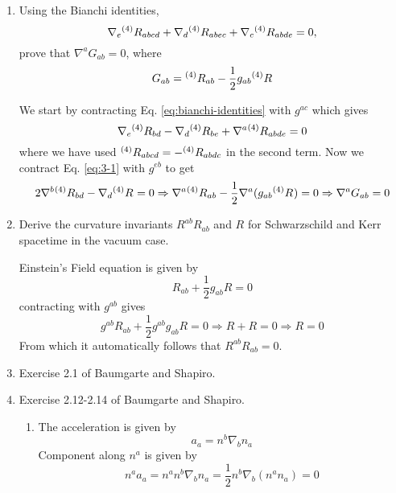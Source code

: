 \documentclass[10pt]{article}
\begin{document}
\begin{enumerate}
\item Using the Bianchi identities,
  \begin{equation}
    \label{eq:bianchi-identities}
    \nabla_e{}^{(4)}R_{abcd} + \nabla_d{}^{(4)}R_{abec} + \nabla_c{}^{(4)}R_{abde} = 0,
  \end{equation}
  prove that $\nabla^aG_{ab} = 0$, where
  \begin{equation}
    \label{eq:Gab}
    G_{ab} = {}^{(4)}R_{ab} - \frac{1}{2}g_{ab} {}^{(4)}R_{}
  \end{equation}

  We start by contracting Eq. \eqref{eq:bianchi-identities} with $g^{ac}$ which gives
  \begin{equation}
    \label{eq:3-1}
    \nabla_{e}{}^{(4)}R_{bd} - \nabla_d {}^{(4)}R_{be} + \nabla^a{}^{(4)}R_{abde} = 0
  \end{equation}
  where we have used ${}^{(4)}R_{abcd} = - {}^{(4)}R_{abdc}$ in the second term. Now we contract Eq. \eqref{eq:3-1} with $g^{eb}$ to get
  \begin{equation}
    \label{eq:}
    2 \nabla^b {}^{(4)}R_{bd} - \nabla_d {}^{(4)}R_{} = 0 \Rightarrow \nabla^a{}^{(4)}R_{ab} - \frac{1}{2} \nabla^a (g_{ab}{}^{(4)}R_{}) = 0 \Rightarrow \nabla^a G_{ab} = 0
  \end{equation}

\item Derive the curvature invariants $R^{ab}R_{ab}$ and $R$ for Schwarzschild and Kerr spacetime in the vacuum case.

  Einstein's Field equation is given by
  \begin{equation}
    \label{eq:EFE}
    R_{ab} + \frac{1}{2} g_{ab}R = 0
  \end{equation}
  contracting with $g^{ab}$ gives
  \begin{equation}
    \label{eq:}
    g^{ab}R_{ab} + \frac{1}{2} g^{ab}g_{ab}R = 0 \Rightarrow R + R = 0 \Rightarrow R = 0
  \end{equation}
  From which it automatically follows that $R^{ab}R_{ab} = 0$.

\item Exercise 2.1 of Baumgarte and Shapiro.
\item Exercise 2.12-2.14 of Baumgarte and Shapiro.
  \begin{enumerate}
  \item The acceleration is given by
    \begin{equation}
      \label{eq:acceleration}
      a_a = n^b \nabla_b n_a
    \end{equation}
    Component along $n^a$ is given by
    \begin{equation}
      \label{eq:projection-along-na}
      n^aa_a = n^a n^b \nabla_b n_a = \frac{1}{2}  n^b \nabla_b(n^an_a) = 0
    \end{equation}


\end{enumerate}
\end{enumerate}
\end{document}
